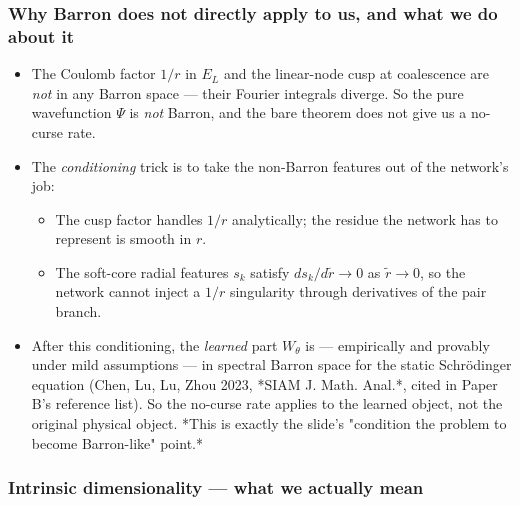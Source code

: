 \documentclass[11pt]{article}
\begin{document}
\subsubsection*{Why Barron does not directly apply to us, and what we do about it}

\begin{itemize}
\item The Coulomb factor $1/r$ in $E_L$ and the linear-node cusp at coalescence
are \emph{not} in any Barron space --- their Fourier integrals diverge. So the
pure wavefunction $\Psi$ is \emph{not} Barron, and the bare theorem does not
give us a no-curse rate.
\item The \emph{conditioning} trick is to take the non-Barron features out of the
network's job:
\begin{itemize}
\item The cusp factor handles $1/r$ analytically; the residue the network
has to represent is smooth in $r$.
\item The soft-core radial features $s_k$ satisfy $ds_k/d\tilde r \to 0$ as
$\tilde r \to 0$, so the network cannot inject a $1/r$ singularity
through derivatives of the pair branch.
\end{itemize}
\item After this conditioning, the \emph{learned} part $W_\theta$ is --- empirically
and provably under mild assumptions --- in spectral Barron space for the
static Schr\"odinger equation (Chen, Lu, Lu, Zhou 2023, *SIAM J. Math.
Anal.*, cited in Paper B's reference list). So the no-curse rate
applies to the learned object, not the original physical object. *This
is exactly the slide's "condition the problem to become Barron-like"
point.*
\end{itemize}
\subsubsection*{Intrinsic dimensionality --- what we actually mean}
\end{document}
